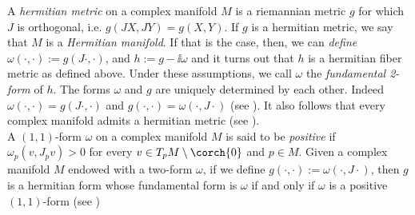 
A \textit{hermitian metric} on a complex manifold \(M\) is a riemannian metric \(g\) for which \(J\) is orthogonal, i.e. \(g(JX, JY)=g(X,Y)\). If \(g\) is a hermitian metric, we say that \(M\) is a \textit{Hermitian manifold}. If that is the case, then, we can \textit{define} \(\omega(\cdot, \cdot):=g(J\cdot, \cdot)\), and \(h:=g-\ii \omega\) and it turns out that \(h\) is a hermitian fiber metric as defined above. Under these assumptions, we call \(\omega\) the \textit{fundamental 2-form} of \(h\). The forms \(\omega\) and \(g\) are uniquely determined by each other. Indeed \(\omega(\cdot, \cdot)=g(J \cdot, \cdot)\) and \(g(\cdot, \cdot)=\omega(\cdot, J \cdot)\) (see \parencite[lemma 8.3 and lemma 8.7]{lee_introCM}). It also follows that every complex manifold admits a hermitian metric (see \parencite[lemma 8.5]{lee_introCM}). \\

A \((1,1)\)-form \(\omega\) on a complex manifold \(M\) is said to be \textit{positive} if \(\omega_p(v,J_pv)>0\) for every \(v \in T_pM \setminus \corch{0}\) and \(p \in M\). Given a complex manifold \(M\) endowed with a two-form \(\omega\), if we define \(g(\cdot, \cdot):=\omega(\cdot, J \cdot)\), then \(g\) is a hermitian form whose fundamental form is \(\omega\) if and only if \(\omega\) is a positive \((1,1)\)-form (see \parencite[Prop. 8.9]{lee_introCM})

